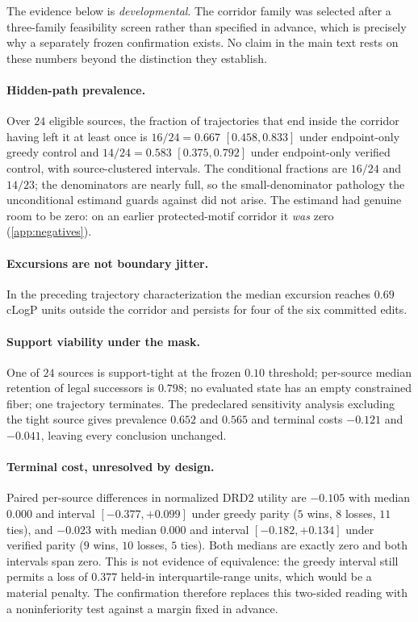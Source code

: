 The evidence below is \emph{developmental}. The corridor family was selected after a three-family feasibility screen rather than specified in advance, which is precisely why a separately frozen confirmation exists. No claim in the main text rests on these numbers beyond the distinction they establish.

\paragraph{Hidden-path prevalence.}
Over $24$ eligible sources, the fraction of trajectories that end inside the corridor having left it at least once is $16/24 = 0.667$ $[0.458,0.833]$ under endpoint-only greedy control and $14/24 = 0.583$ $[0.375,0.792]$ under endpoint-only verified control, with source-clustered intervals. The conditional fractions are $16/24$ and $14/23$; the denominators are nearly full, so the small-denominator pathology the unconditional estimand guards against did not arise. The estimand had genuine room to be zero: on an earlier protected-motif corridor it \emph{was} zero (\cref{app:negatives}).

\paragraph{Excursions are not boundary jitter.}
In the preceding trajectory characterization the median excursion reaches $0.69$ cLogP units outside the corridor and persists for four of the six committed edits.

\paragraph{Support viability under the mask.}
One of $24$ sources is support-tight at the frozen $0.10$ threshold; per-source median retention of legal successors is $0.798$; no evaluated state has an empty constrained fiber; one trajectory terminates. The predeclared sensitivity analysis excluding the tight source gives prevalence $0.652$ and $0.565$ and terminal costs $-0.121$ and $-0.041$, leaving every conclusion unchanged.

\paragraph{Terminal cost, unresolved by design.}
Paired per-source differences in normalized DRD2 utility are $-0.105$ with median $0.000$ and interval $[-0.377,+0.099]$ under greedy parity ($5$ wins, $8$ losses, $11$ ties), and $-0.023$ with median $0.000$ and interval $[-0.182,+0.134]$ under verified parity ($9$ wins, $10$ losses, $5$ ties). Both medians are exactly zero and both intervals span zero. This is not evidence of equivalence: the greedy interval still permits a loss of $0.377$ held-in interquartile-range units, which would be a material penalty. The confirmation therefore replaces this two-sided reading with a noninferiority test against a margin fixed in advance.

